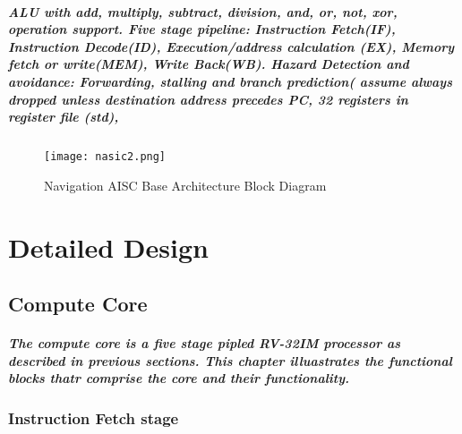 \documentclass[12pt,a4paper]{report}
\begin{document}
\paragraph{\textrm{\textmd{ALU with add, multiply, subtract, division, and, or, not, xor, operation support.
			Five stage pipeline: Instruction Fetch(IF), Instruction Decode(ID), Execution/address calculation (EX), Memory fetch or write(MEM), Write Back(WB).
			Hazard Detection and avoidance: Forwarding, stalling and branch prediction( assume always dropped unless destination address precedes PC,
			32 registers in register file (std),}}}
\begin{figure}[h]
	\centering
	\texttt{[image: nasic2.png]}
	\caption{Navigation AISC Base Architecture Block Diagram}
\end{figure}
\chapter{Detailed Design}
\section{Compute Core}
\paragraph{\textrm{\textmd{The compute core is a five stage pipled RV-32IM processor as described in previous sections. This chapter illuastrates the functional blocks thatr comprise the core and their functionality.}}}
\subsection{Instruction Fetch stage}
\end{document}
